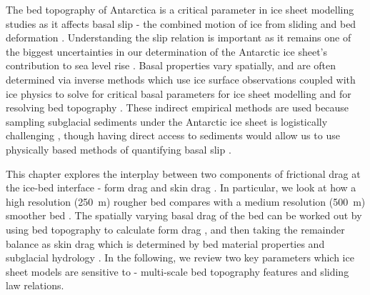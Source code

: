The bed topography of Antarctica is a critical parameter in ice sheet modelling studies as it affects basal slip - the combined motion of ice from sliding and bed deformation \citep[][p.223]{Cuffeyphysicsglaciers2010}.
Understanding the slip relation is important as it remains one of the biggest uncertainties in our determination of the Antarctic ice sheet's contribution to sea level rise \citep[e.g.][]{RitzPotentialsealevelrise2015,BulthuisUncertaintyquantificationmulticentennial2019}.
Basal properties vary spatially, and are often determined via inverse methods which use ice surface observations coupled with ice physics to solve for critical basal parameters for ice sheet modelling \citep[e.g.][]{MacAyealbasalstressdistribution1992,JoughinBasalconditionsPine2009,MorlighemInversionbasalfriction2013} and for resolving bed topography \citep[e.g.][]{MorlighemDeepglacialtroughs2019,LeongDeepBedMapdeepneural2020}.
These indirect empirical methods are used because sampling subglacial sediments under the Antarctic ice sheet is logistically challenging \citep[e.g.][]{Siegertassessmentdeephotwater2014,TulaczykWISSARDSubglacialLake2014}, though having direct access to sediments would allow us to use physically based methods of quantifying basal slip \citep[e.g.][]{Zoetsliplawglaciers2020}.

This chapter explores the interplay between two components of frictional drag at the ice-bed interface - form drag and skin drag \citep{SchoofBasalperturbationsice2002,BinghamDiverselandscapesPine2017,Kyrke-SmithRelevanceDetailBasal2018,Minchewuniversalglacierslip2020}.
In particular, we look at how a high resolution (\SI{250}{\metre}) rougher bed \citep{LeongDeepBedMap2020} compares with a medium resolution (\SI{500}{\metre}) smoother bed \citep{MorlighemMEaSUREsBedMachineAntarctica2020}.
The spatially varying basal drag of the bed can be worked out by using bed topography to calculate form drag \citep{SchoofBasalperturbationsice2002}, and then taking the remainder balance as skin drag which is determined by bed material properties and subglacial hydrology \citep{Kyrke-SmithRelevanceDetailBasal2018}. %
In the following, we review two key parameters which ice sheet models are sensitive to - multi-scale bed topography features and sliding law relations.




